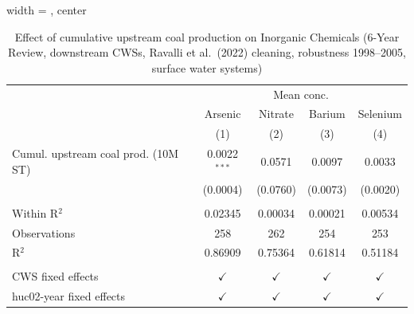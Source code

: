 
\begin{table}[htbp]
   
   \caption{\label{tab:6yr_huc02fe_inorg_ravalli_2005_surfacewater} Effect of cumulative upstream coal production on Inorganic Chemicals (6-Year Review, downstream CWSs, Ravalli et al.~(2022) cleaning, robustness 1998--2005, surface water systems)}
   \bigskip
   
   \centering
   
   \begin{adjustbox}{width = \textwidth, center}
      
      
      \begin{tabular}{lcccc}
         \toprule
         
          & \multicolumn{4}{c}{Mean conc.}\\
         
                                             & Arsenic        & Nitrate       & Barium        & Selenium \\   
         
                                             & (1)            & (2)           & (3)           & (4)\\  
         
         \midrule 
         Cumul. upstream coal prod. (10M ST) & 0.0022$^{***}$ & 0.0571        & 0.0097        & 0.0033\\   
                                             & (0.0004)       & (0.0760)      & (0.0073)      & (0.0020)\\   
         
          \\
         
         Within R$^2$                        & 0.02345        & 0.00034       & 0.00021       & 0.00534\\  
         Observations                        & 258            & 262           & 254           & 253\\  
         R$^2$                               & 0.86909        & 0.75364       & 0.61814       & 0.51184\\  
         
          \\
         
         CWS fixed effects                   & $\checkmark$   & $\checkmark$  & $\checkmark$  & $\checkmark$\\   
         huc02-year fixed effects            & $\checkmark$   & $\checkmark$  & $\checkmark$  & $\checkmark$\\   
         

\end{tabular}
\end{adjustbox}
\end{table}

